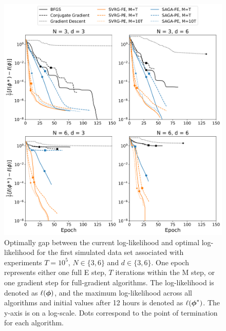 \documentclass[12pt]{article}
\begin{document}
\newpage

\begin{figure}[H]
    \centering
    \includegraphics[width=6.5in]{../plt/log-like_v_epoch_T-100000-000.png}
    \caption{Optimally gap between the current log-likelihood and optimal log-likelihood for the first simulated data set associated with experiments $T=10^{5}$, $N \in \{3,6\}$ and $d \in \{3,6\}$. One epoch represents either one full E step, $T$ iterations within the M step, or one gradient step for full-gradient algorithms. The log-likelihood is denoted as $\ell(\boldsymbol{\phi})$, and the maximum log-likelihood across all algorithms and initial values after 12 hours is denoted as $\ell(\boldsymbol{\phi}^*)$. The y-axis is on a log-scale. Dots correspond to the point of termination for each algorithm.}
\end{figure}
%
\end{document}
